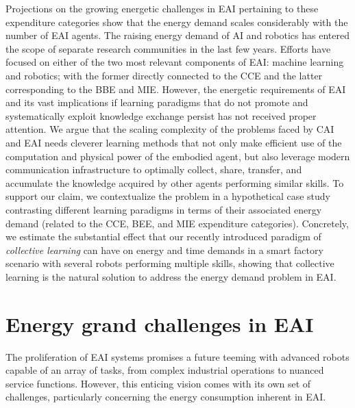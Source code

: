 \documentclass[12pt]{article}
\renewcommand{\emph}[1]{\textit{#1}}
\begin{document}
Projections on the growing energetic challenges in EAI pertaining to these expenditure categories show that the energy demand scales considerably with the number of EAI agents. The raising energy demand of AI and robotics has entered the scope of separate research communities in the last few years. Efforts have focused on either of the two most relevant components of EAI: machine learning and robotics; with the former directly connected to the CCE and the latter corresponding to the BBE and MIE. However, the energetic requirements of EAI and its vast implications if learning paradigms that do not promote and systematically exploit knowledge exchange persist has not received proper attention. We argue that the scaling complexity of the problems faced by CAI and EAI needs cleverer learning methods that not only make efficient use of the computation and physical power of the embodied agent, but also leverage modern communication infrastructure to optimally collect, share, transfer, and accumulate the knowledge acquired by other agents performing similar skills. To support our claim, we contextualize the problem in a hypothetical case study contrasting different learning paradigms in terms of their associated energy demand (related to the CCE, BEE, and MIE expenditure categories). Concretely, we estimate the substantial effect that our recently introduced paradigm of \emph{collective learning} \cite{Haddadin2014SystemzumErstellen,Haddadin2015Systemgeneratingsets} can have on energy and time demands in a smart factory scenario with several robots performing multiple skills, showing that collective learning is the natural solution to address the energy demand problem in EAI.

\section*{Energy grand challenges in EAI}\label{sec:energy_grand_challenges}
The proliferation of EAI systems promises a future teeming with advanced robots capable of an array of tasks, from complex industrial operations to nuanced service functions. However, this enticing vision comes with its own set of challenges, particularly concerning the energy consumption inherent in EAI.
\end{document}
